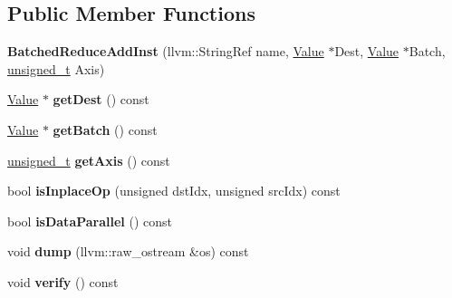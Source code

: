 \subsection*{Public Member Functions}
\begin{DoxyCompactItemize}
\item 
\mbox{\label{classglow_1_1_batched_reduce_add_inst_a3944fbb1a6c3296f7dfbce9bf3063dc3}} 
{\bfseries Batched\+Reduce\+Add\+Inst} (llvm\+::\+String\+Ref name, \hyperlink{classglow_1_1_value}{Value} $\ast$Dest, \hyperlink{classglow_1_1_value}{Value} $\ast$Batch, \hyperlink{namespaceglow_a0ca574644e1e42ef193a9947fb4d8911}{unsigned\+\_\+t} Axis)
\item 
\mbox{\label{classglow_1_1_batched_reduce_add_inst_ad510abab58e4364d9fc3a5eae005d939}} 
\hyperlink{classglow_1_1_value}{Value} $\ast$ {\bfseries get\+Dest} () const
\item 
\mbox{\label{classglow_1_1_batched_reduce_add_inst_aabcc0cbfe77e8b2f644ccac38802f30c}} 
\hyperlink{classglow_1_1_value}{Value} $\ast$ {\bfseries get\+Batch} () const
\item 
\mbox{\label{classglow_1_1_batched_reduce_add_inst_a6c5612fc14ba16c68471cd887a573bad}} 
\hyperlink{namespaceglow_a0ca574644e1e42ef193a9947fb4d8911}{unsigned\+\_\+t} {\bfseries get\+Axis} () const
\item 
\mbox{\label{classglow_1_1_batched_reduce_add_inst_a3becec0fe9a9aa3a0679f010bb30f943}} 
bool {\bfseries is\+Inplace\+Op} (unsigned dst\+Idx, unsigned src\+Idx) const
\item 
\mbox{\label{classglow_1_1_batched_reduce_add_inst_a9a85c2ffaef1277278134ddcc32d4556}} 
bool {\bfseries is\+Data\+Parallel} () const
\item 
\mbox{\label{classglow_1_1_batched_reduce_add_inst_ab449e666a97a94347d3b91a19af3527c}} 
void {\bfseries dump} (llvm\+::raw\+\_\+ostream \&os) const
\item 
\mbox{\label{classglow_1_1_batched_reduce_add_inst_a25f38b2a8dc3d6173088773d18a81a20}} 
void {\bfseries verify} () const
\end{DoxyCompactItemize}
